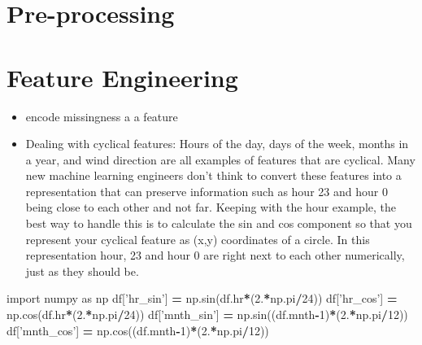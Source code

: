 \documentclass[]{book}
\newenvironment{Shaded}{\begin{snugshade}}{\end{snugshade}}
\newcommand{\DecValTok}[1]{\textcolor[rgb]{0.00,0.00,0.81}{#1}}
\newcommand{\StringTok}[1]{\textcolor[rgb]{0.31,0.60,0.02}{#1}}
\newcommand{\ImportTok}[1]{#1}
\newcommand{\OperatorTok}[1]{\textcolor[rgb]{0.81,0.36,0.00}{\textbf{#1}}}
\newcommand{\NormalTok}[1]{#1}
\begin{document}
\section{Pre-processing}\label{pre-processing}

\section{Feature Engineering}\label{feature-engineering}

\begin{itemize}
\item
  encode missingness a a feature
\item
  Dealing with cyclical features: Hours of the day, days of the week,
  months in a year, and wind direction are all examples of features that
  are cyclical. Many new machine learning engineers don't think to
  convert these features into a representation that can preserve
  information such as hour 23 and hour 0 being close to each other and
  not far. Keeping with the hour example, the best way to handle this is
  to calculate the sin and cos component so that you represent your
  cyclical feature as (x,y) coordinates of a circle. In this
  representation hour, 23 and hour 0 are right next to each other
  numerically, just as they should be.
\end{itemize}

\begin{Shaded}
\begin{Highlighting}[]
\ImportTok{import}\NormalTok{ numpy }\ImportTok{as}\NormalTok{ np}
\NormalTok{df[}\StringTok{'hr_sin'}\NormalTok{] }\OperatorTok{=}\NormalTok{ np.sin(df.hr}\OperatorTok{*}\NormalTok{(}\DecValTok{2}\NormalTok{.}\OperatorTok{*}\NormalTok{np.pi}\OperatorTok{/}\DecValTok{24}\NormalTok{))}
\NormalTok{df[}\StringTok{'hr_cos'}\NormalTok{] }\OperatorTok{=}\NormalTok{ np.cos(df.hr}\OperatorTok{*}\NormalTok{(}\DecValTok{2}\NormalTok{.}\OperatorTok{*}\NormalTok{np.pi}\OperatorTok{/}\DecValTok{24}\NormalTok{))}
\NormalTok{df[}\StringTok{'mnth_sin'}\NormalTok{] }\OperatorTok{=}\NormalTok{ np.sin((df.mnth}\OperatorTok{-}\DecValTok{1}\NormalTok{)}\OperatorTok{*}\NormalTok{(}\DecValTok{2}\NormalTok{.}\OperatorTok{*}\NormalTok{np.pi}\OperatorTok{/}\DecValTok{12}\NormalTok{))}
\NormalTok{df[}\StringTok{'mnth_cos'}\NormalTok{] }\OperatorTok{=}\NormalTok{ np.cos((df.mnth}\OperatorTok{-}\DecValTok{1}\NormalTok{)}\OperatorTok{*}\NormalTok{(}\DecValTok{2}\NormalTok{.}\OperatorTok{*}\NormalTok{np.pi}\OperatorTok{/}\DecValTok{12}\NormalTok{))}
\end{Highlighting}
\end{Shaded}
\end{document}
